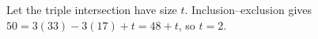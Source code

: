 Let the triple intersection have size $t$. Inclusion--exclusion gives $50=3(33)-3(17)+t=48+t$, so $\boxed{t=2}$.
